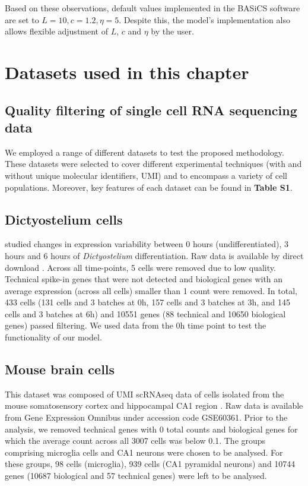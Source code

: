 Based on these observations, default values implemented in the BASiCS software are set to $L=10, c=1.2, \eta=5$. Despite this, the model's implementation also allows flexible adjustment of $L$, $c$ and $\eta$ by the user. 

\section{Datasets used in this chapter} \label{sec2:datasets}

\subsection*{Quality filtering of single cell RNA sequencing data}
We employed a range of different datasets to test the proposed methodology. These datasets were selected to cover different experimental techniques (with and without unique molecular identifiers, UMI) and to encompass a variety of cell populations. Moreover, key features of each dataset can be found in \textbf{Table S1}. 

\subsection{Dictyostelium cells} \label{seq::data_dict}

\cite{Antolovic2017} studied changes in expression variability between 0 hours (undifferentiated), 3 hours and 6 hours of \emph{Dictyostelium} differentiation. Raw data is available by direct download \citep[see Data S1 in][]{Antolovic2017}. Across all time-points, 5 cells were removed due to low quality. Technical spike-in genes that were not detected and biological genes with an average expression (across all cells) smaller than 1 count were removed. In total, 433 cells (131 cells and 3 batches at 0h, 157 cells and 3 batches at 3h, and 145 cells and 3 batches at 6h) and 10551 genes (88 technical and 10650 biological genes) passed filtering. We used data from the 0h time point to test the functionality of our model.

\subsection{Mouse brain cells} \label{seq::data_micro}
This dataset was composed of UMI scRNAseq data of cells isolated from the mouse somatosensory cortex and hippocampal CA1 region \citep{Zeisel2015}. Raw data is available from Gene Expression Omnibus under accession code GSE60361. 
Prior to the analysis, we removed technical genes with 0 total counts and biological genes for which the average count across all 3007 cells was below 0.1. The groups comprising microglia cells and CA1 neurons were chosen to be analysed. For these groups, 98 cells (microglia), 939 cells (CA1 pyramidal neurons) and 10744 genes (10687 biological and 57 technical genes) were left to be analysed.

